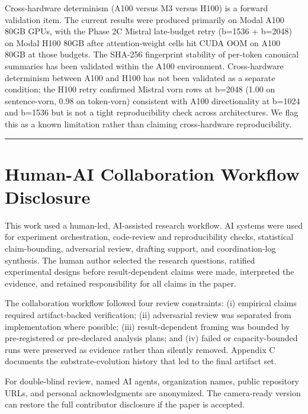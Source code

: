 \documentclass[10pt]{article}
\begin{document}
Cross-hardware determinism (A100 versus M3 versus H100) is a forward
validation item. The current results were produced primarily on Modal
A100 80GB GPUs, with the Phase 2C Mistral late-budget retry (b=1536 +
b=2048) on Modal H100 80GB after attention-weight cells hit CUDA OOM on
A100 80GB at those budgets. The SHA-256 fingerprint stability of
per-token canonical summaries has been validated within the A100
environment. Cross-hardware determinism between A100 and H100 has not
been validated as a separate condition; the H100 retry confirmed Mistral
vorn rows at b=2048 (1.00 on sentence-vorn, 0.98 on token-vorn)
consistent with A100 directionality at b=1024 and b=1536 but is not a
tight reproducibility check across architectures. We flag this as a
known limitation rather than claiming cross-hardware reproducibility.

\begin{center}\rule{0.5\linewidth}{0.5pt}\end{center}


\section{Human-AI Collaboration Workflow Disclosure}\label{appendix-b-human-ai-collaboration-workflow-disclosure}

This work used a human-led, AI-assisted research workflow. AI systems were
used for experiment orchestration, code-review and reproducibility checks,
statistical claim-bounding, adversarial review, drafting support, and
coordination-log synthesis. The human author selected the research questions,
ratified experimental designs before result-dependent claims were made,
interpreted the evidence, and retained responsibility for all claims in the
paper.

The collaboration workflow followed four review constraints: (i) empirical
claims required artifact-backed verification; (ii) adversarial review was
separated from implementation where possible; (iii) result-dependent framing
was bounded by pre-registered or pre-declared analysis plans; and (iv)
failed or capacity-bounded runs were preserved as evidence rather than
silently removed. Appendix C documents the substrate-evolution history that
led to the final artifact set.

For double-blind review, named AI agents, organization names, public
repository URLs, and personal acknowledgments are anonymized. The
camera-ready version can restore the full contributor disclosure if the
paper is accepted.
\end{document}
